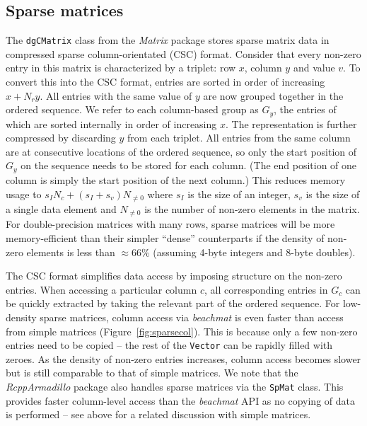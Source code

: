 \documentclass[10pt,letterpaper]{article}
\newcommand{\beachmat}{\textit{beachmat}}
\newcommand{\code}[1]{\texttt{#1}}
\begin{document}
\subsection*{Sparse matrices}
The \code{dgCMatrix} class from the \textit{Matrix} package stores sparse matrix data in compressed sparse column-orientated (CSC) format.
Consider that every non-zero entry in this matrix is characterized by a triplet: row $x$, column $y$ and value $v$.
To convert this into the CSC format, entries are sorted in order of increasing $x + N_ry$.
All entries with the same value of $y$ are now grouped together in the ordered sequence.
We refer to each column-based group as $G_y$, the entries of which are sorted internally in order of increasing $x$.
The representation is further compressed by discarding $y$ from each triplet.
All entries from the same column are at consecutive locations of the ordered sequence, so only the start position of $G_y$ on the sequence needs to be stored for each column.
(The end position of one column is simply the start position of the next column.)
This reduces memory usage to $s_IN_c + (s_I + s_v) N_{\ne 0}$ where $s_I$ is the size of an integer, $s_v$ is the size of a single data element and $N_{\ne 0}$ is the number of non-zero elements in the matrix.
For double-precision matrices with many rows, sparse matrices will be more memory-efficient than their simpler ``dense'' counterparts if the density of non-zero elements is less than $\approx66$\% (assuming 4-byte integers and 8-byte doubles). 


The CSC format simplifies data access by imposing structure on the non-zero entries.
When accessing a particular column $c$, all corresponding entries in $G_c$ can be quickly extracted by taking the relevant part of the ordered sequence.
For low-density sparse matrices, column access via \beachmat{} is even faster than access from simple matrices (Figure~\ref{fig:sparsecol}).
This is because only a few non-zero entries need to be copied -- the rest of the \code{Vector} can be rapidly filled with zeroes.
As the density of non-zero entries increases, column access becomes slower but is still comparable to that of simple matrices.
We note that the \textit{RcppArmadillo} package \cite{eddelbuettel2014arma} also handles sparse matrices via the \code{SpMat} class.
This provides faster column-level access than the \beachmat{} API as no copying of data is performed -- see above for a related discussion with simple matrices.
\end{document}
